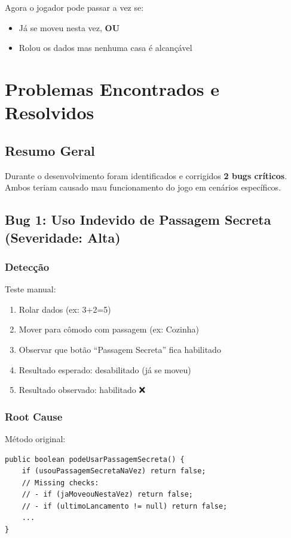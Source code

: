 \documentclass[12pt,a4paper]{report}
\begin{document}
Agora o jogador pode passar a vez se:
\begin{itemize}
    \item Já se moveu nesta vez, \textbf{OU}
    \item Rolou os dados mas nenhuma casa é alcançável
\end{itemize}

\chapter{Problemas Encontrados e Resolvidos}

\section{Resumo Geral}

Durante o desenvolvimento foram identificados e corrigidos \textbf{2 bugs críticos}. Ambos teriam causado mau funcionamento do jogo em cenários específicos.

\section{Bug 1: Uso Indevido de Passagem Secreta (Severidade: Alta)}

\subsection{Detecção}

Teste manual:
\begin{enumerate}
    \item Rolar dados (ex: 3+2=5)
    \item Mover para cômodo com passagem (ex: Cozinha)
    \item Observar que botão ``Passagem Secreta'' fica habilitado
    \item Resultado esperado: desabilitado (já se moveu)
    \item Resultado observado: habilitado ❌
\end{enumerate}

\subsection{Root Cause}

Método original:
\begin{lstlisting}
public boolean podeUsarPassagemSecreta() {
    if (usouPassagemSecretaNaVez) return false;
    // Missing checks:
    // - if (jaMoveouNestaVez) return false;
    // - if (ultimoLancamento != null) return false;
    ...
}
\end{lstlisting}
\end{document}
